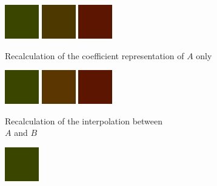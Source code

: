 \begin{figure}[t!]
	\centering
	\captionsetup[subfigure]{font=footnotesize,labelfont=footnotesize}
	\captionsetup[subfigure]{justification=centering}
	\begin{subfigure}{0.30\textwidth}
		\includegraphics[width=1\linewidth,height=4em]{img/recalculation_color_green.png}
		\includegraphics[width=1\linewidth,height=4em]{img/recalculation_color_fitGreen.png}
		\includegraphics[width=1\linewidth,height=4em]{img/recalculation_color_red.png}
		\caption{Recalculation of the coefficient representation of $A$ only}
		\label{fig:recalculation_colorGradients_green}
	\end{subfigure}
	\begin{subfigure}{0.30\textwidth}
		\includegraphics[width=1\linewidth,height=4em]{img/recalculation_color_green.png}
		\includegraphics[width=1\linewidth,height=4em]{img/recalculation_color_interpolated.png}
		\includegraphics[width=1\linewidth,height=4em]{img/recalculation_color_red.png}
		\caption{Recalculation of the interpolation between\\ $A$ and $B$}
		\label{fig:recalculation_colorGradients_interpolated}
	\end{subfigure}
	\begin{subfigure}{0.30\textwidth}
		\includegraphics[width=1\linewidth,height=4em]{img/recalculation_color_green.png}

\end{subfigure}
\end{figure}
